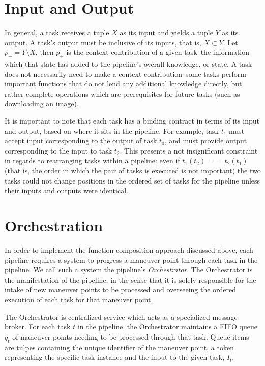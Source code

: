 \section{Input and Output}\label{sec:arch:io}
In general, a task receives a tuple $X$ as its input and yields a tuple $Y$ as its output. A task’s output must be inclusive of its inputs, that is, $X \subset Y$. Let $p_+ = Y \setminus X$, then $p_+$ is the context contribution of a given task--the information which that state has added to the pipeline's overall knowledge, or state. A task does not necessarily need to make a context contribution--some tasks perform important functions that do not lend any additional knowledge directly, but rather complete operations which are  prerequisites for future tasks (such as downloading an image).

It is important to note that each task has a binding contract in terms of its input and output, based on where it sits in the pipeline. For example, task $t_1$ must accept input corresponding to the output of task $t_0$, and must provide output corresponding to the input to task $t_2$. This presents a not insignificant constraint in regards to rearranging tasks within a pipeline: even if $t_1(t_2) == t_2(t_1)$ (that is, the order in which the pair of tasks is executed is not important) the two tasks could not change positions in the ordered set of tasks for the pipeline unless their inputs and outputs were identical. 

\section{Orchestration}\label{sec:arch:orchestration}
In order to implement the function composition approach discussed above, each pipeline requires a system to progress a maneuver point through each task in the pipeline. We call such a system the pipeline’s \textit{Orchestrator}. The Orchestrator is the manifestation of the pipeline, in the sense that it is solely responsible for the intake of new maneuver points to be processed and overseeing the ordered execution of each task for that maneuver point.

The Orchestrator is centralized service which acts as a specialized message broker. For each task $t$ in the pipeline, the Orchestrator maintains a FIFO queue $q_t$ of maneuver points needing to be processed through that task. Queue items are tulpes containing the unique identifier of the maneuver point, a token representing the specific task instance and the input to the given task, $I_t$.

